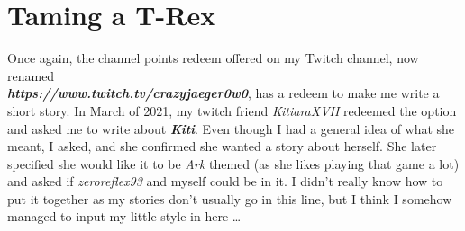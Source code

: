 \documentclass[a4paper,onecolumn,11pt]{article}
\begin{document}

\section{Taming a T-Rex}

Once again, the channel points redeem offered on my Twitch channel, now renamed \\\textbf{\textit{https://www.twitch.tv/crazyjaeger0w0}}, has a redeem to make me write a short story. In March of 2021, my twitch friend \textit{KitiaraXVII} redeemed the option and asked me to write about \textbf{\textit{Kiti}}. Even though I had a general idea of what she meant, I asked, and she confirmed she wanted a story about herself. She later specified she would like it to be \textit{Ark} themed (as she likes playing that game a lot) and asked if \textit{zeroreflex93} and myself could be in it. I didn’t really know how to put it together as my stories don’t usually go in this line, but I think I somehow managed to input my little style in here \ldots


\end{document}
